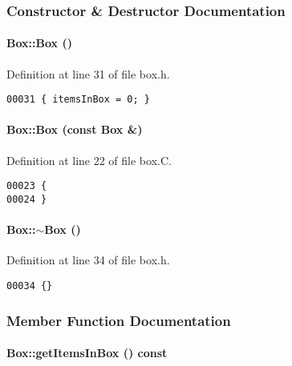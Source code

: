 \subsubsection{Constructor \& Destructor Documentation}
\label{Box_a0}
\paragraph{\setlength{\rightskip}{0pt plus 5cm}Box::Box ()\hspace{0.3cm}{\tt  [inline]}}\hfill



Definition at line 31 of file box.h.\small\begin{verbatim}00031 { itemsInBox = 0; }
\end{verbatim}\normalsize 
\label{Box_a1}
\paragraph{\setlength{\rightskip}{0pt plus 5cm}Box::Box (const Box \&)}\hfill



Definition at line 22 of file box.C.\small\begin{verbatim}00023 {
00024 }
\end{verbatim}\normalsize 
\label{Box_a2}
\paragraph{\setlength{\rightskip}{0pt plus 5cm}Box::$\sim$Box ()\hspace{0.3cm}{\tt  [inline, virtual]}}\hfill



Definition at line 34 of file box.h.\small\begin{verbatim}00034 {}
\end{verbatim}\normalsize 


\subsubsection{Member Function Documentation}
\label{Box_a12}
\paragraph{ Box::get\-Items\-In\-Box () const\hspace{0.3cm}{\tt  [inline]}}\hfill



